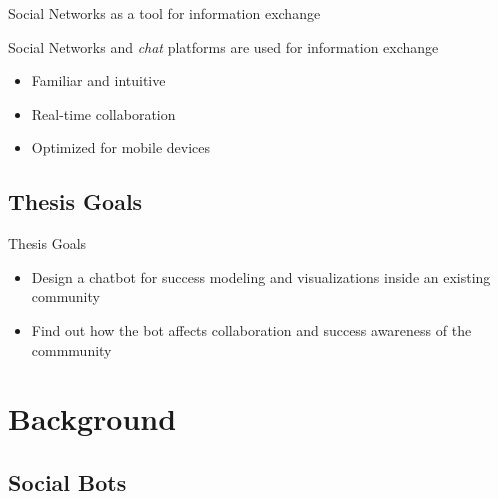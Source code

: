 \begin{frame}{Social Networks as a tool for information exchange}
  
  Social Networks and \emph{chat} platforms are used for information exchange
  \begin{itemize}
    \item Familiar and intuitive
    \item Real-time collaboration
    \item Optimized for mobile devices
  \end{itemize}
\end{frame}


\subsection{Thesis Goals}

\begin{frame}{Thesis Goals}
  \begin{itemize}
    \item Design a chatbot for success modeling and visualizations
          inside an existing community
    \item Find out how the bot affects collaboration and success awareness of the commmunity %
  \end{itemize}
\end{frame}

\section{Background}

\subsection{Social Bots}


